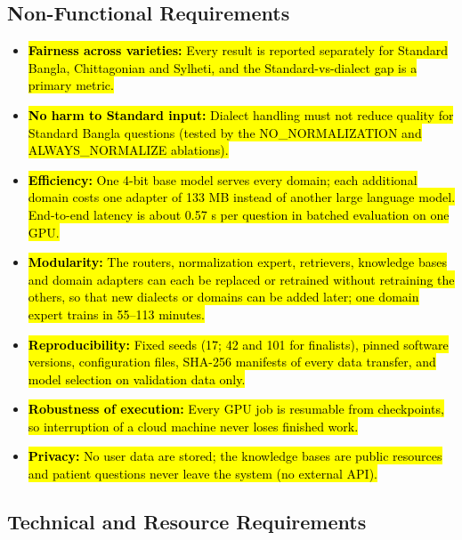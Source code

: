 \subsection{Non-Functional Requirements}\label{non-functional-requirements}

\begin{itemize}
\item \hl{\textbf{Fairness across varieties:} Every result is reported
separately for Standard Bangla, Chittagonian and Sylheti, and the
Standard-vs-dialect gap is a primary metric.}

\item \hl{\textbf{No harm to Standard input:} Dialect handling must not
reduce quality for Standard Bangla questions (tested by the
NO\_NORMALIZATION and ALWAYS\_NORMALIZE ablations).}

\item \hl{\textbf{Efficiency:} One 4-bit base model serves every domain;
each additional domain costs one adapter of 133 MB instead of another
large language model. End-to-end latency is about 0.57 s per question in
batched evaluation on one GPU.}

\item \hl{\textbf{Modularity:} The routers, normalization expert,
retrievers, knowledge bases and domain adapters can each be replaced or
retrained without retraining the others, so that new dialects or domains
can be added later; one domain expert trains in 55--113 minutes.}

\item \hl{\textbf{Reproducibility:} Fixed seeds (17; 42 and 101 for
finalists), pinned software versions, configuration files, SHA-256
manifests of every data transfer, and model selection on validation data
only.}

\item \hl{\textbf{Robustness of execution:} Every GPU job is resumable from
checkpoints, so interruption of a cloud machine never loses finished
work.}

\item \hl{\textbf{Privacy:} No user data are stored; the knowledge bases are
public resources and patient questions never leave the system (no
external API).}
\end{itemize}

\subsection{Technical and Resource Requirements}\label{technical-and-resource-requirements}

